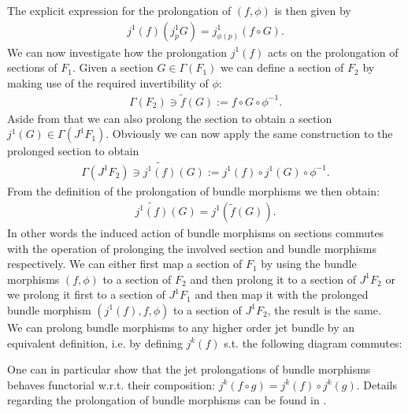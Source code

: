 \documentclass[a4paper,12pt, DIV=14, BCOR=5mm, twoside, headsepline]{scrbook}
\begin{document}
The explicit expression for the prolongation of $(f,\phi)$ is then given by
\begin{align}
    j^1(f)(j^1_pG) = j^1_{\phi(p)}(f\circ G).
\end{align}
We can now investigate how the prolongation $j^1(f)$ acts on the prolongation of sections of $F_1$.
Given a section $G \in \Gamma(F_1)$ we can define a section of $F_2$ by making use of the required invertibility of $\phi$: 
\begin{align}
\Gamma(F_2) \ni \widetilde{f}(G) := f \circ G \circ \phi^{-1}.
\end{align}
Aside from that we can also prolong the section to obtain a section $j^1(G) \in \Gamma(J^1F_1)$. Obviously we can now apply the same construction to the prolonged section to obtain 
\begin{align}
\Gamma(J^1F_2) \ni \widetilde{j^1(f)}(G) := j^1(f) \circ j^1(G) \circ \phi^{-1}.
\end{align}
From the definition of the prolongation of bundle morphisms we then obtain:
\begin{align}
    \widetilde{j^1(f)}(G) = j^1(\widetilde{f}(G)).
\end{align}
In other words the induced action of bundle morphisms on sections commutes with the operation of prolonging the involved section and bundle morphisms respectively. We can either first map a section of $F_1$ by using the bundle morphisms $(f,\phi)$ to a section of $F_2$ and then prolong it to a section of $J^1F_2$ or we prolong it first to a section of $J^1F_1$ and then map it with the prolonged bundle morphism $(j^1(f),f,\phi)$ to a section of $J^1F_2$, the result is the same.  \\

We can prolong bundle morphisms to any higher order jet bundle by an equivalent definition, i.e. by defining $j^k(f)$ s.t. the following diagram commutes:
\begin{center}
\end{center}
One can in particular show that the jet prolongations of bundle morphisms behaves functorial w.r.t. their composition: $j^k(f\circ g) = j^k(f) \circ j^k (g)$. Details regarding the prolongation of bundle morphisms can be found in \cite{saunders_1989}.\\
\end{document}
